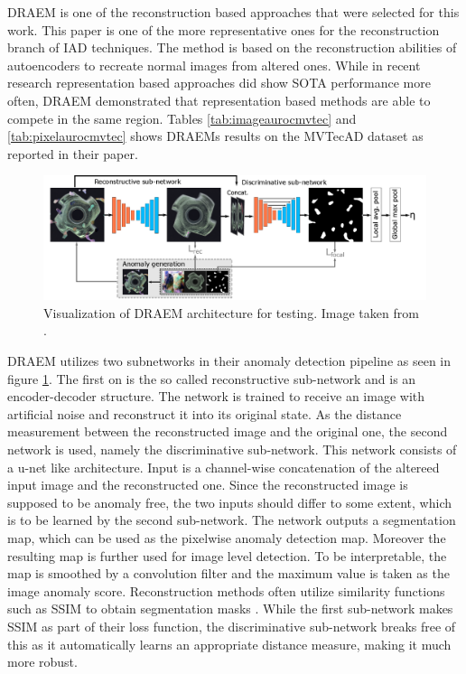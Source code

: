 DRAEM \cite{Zavrtanik_2021DRAEM} is one of the reconstruction based approaches that were selected for this work. This paper is one of the more representative ones for the reconstruction branch of 
IAD techniques. The method is based on the reconstruction abilities of autoencoders to recreate normal images from altered ones. While in recent research representation based approaches did 
show SOTA performance more often, DRAEM demonstrated that representation based methods are able to compete in the same region. Tables \ref{tab:imageaurocmvtec} and 
\ref{tab:pixelaurocmvtec} shows DRAEMs results on the MVTecAD dataset as reported 
in their paper.\newline

\begin{figure}[ht]
    \centering
    \includegraphics[width=\textwidth]{figures/DRAEM_pipeline.png}
    \caption{Visualization of DRAEM architecture for testing. Image taken from \cite{Zavrtanik_2021DRAEM}.}
    \label{fig:draempipeline}
\end{figure}

DRAEM utilizes two subnetworks in their anomaly detection pipeline as seen in figure \ref{fig:draempipeline}. The first on is the so called reconstructive sub-network and is an encoder-decoder structure. The network is trained 
to receive an image with artificial noise and reconstruct it into its original state. As the distance measurement between the reconstructed image and the original one, the second network is used, 
namely the discriminative sub-network. This network consists of a u-net \cite{Ronneberger_2015UNET} like architecture. Input is a channel-wise concatenation of the altereed input image and the reconstructed 
one. Since the reconstructed image is supposed to be anomaly free, the two inputs should differ to some extent, which is to be learned by the second sub-network. The network outputs a segmentation map, 
which can be used as the pixelwise anomaly detection map. Moreover the resulting map is further used for image level detection. To be interpretable, the map is smoothed by a convolution filter 
and the maximum value is taken as the image anomaly score. Reconstruction methods often utilize similarity functions such as SSIM \cite{Wang_2004SSIM} to obtain segmentation masks \cite{Zavrtanik_2021DRAEM} 
\cite{liu2024deep}. While the first 
sub-network makes SSIM as part of their loss function, the discriminative sub-network breaks free of this as it automatically learns an appropriate distance measure, making it much more robust.

